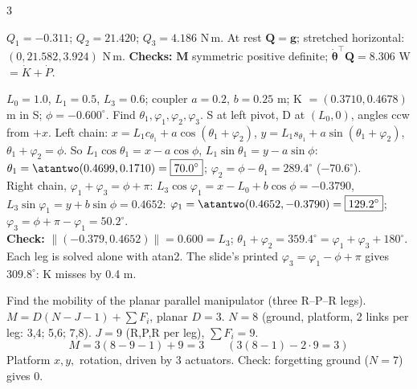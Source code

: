 \begin{multicols}{3}
\begin{examq}[Q4 (e): numbers]
$Q_1=\boxed{-0.311}$; $Q_2=\boxed{21.420}$; $Q_3=\boxed{4.186}$ N\,m. At rest $\mathbf Q=\mathbf g$; stretched horizontal: $(0,21.582,3.924)$ N\,m. \textbf{Checks:} $\mathbf M$ symmetric positive definite; $\dot{\boldsymbol\theta}^\top\mathbf Q=8.306$ W $=\dot K+\dot P$. \chk
\end{examq}
\begin{examq}
$L_0=1.0$, $L_1=0.5$, $L_3=0.6$; coupler $a=0.2$, $b=0.25$ m; K $=(0.3710,0.4678)$ m in {S}; $\phi=-0.600^\circ$. Find $\theta_1,\varphi_1,\varphi_2,\varphi_3$.
\solution
{S} at left pivot, {D} at $(L_0,0)$, angles ccw from $+x$. Left chain: $x=L_1c_{\theta_1}+a\cos(\theta_1{+}\varphi_2)$, $y=L_1s_{\theta_1}+a\sin(\theta_1{+}\varphi_2)$, $\theta_1+\varphi_2=\phi$. So $L_1\cos\theta_1=x-a\cos\phi$, $L_1\sin\theta_1=y-a\sin\phi$: $\theta_1=\atantwo(0.4699,0.1710)=\boxed{70.0^\circ}$; $\varphi_2=\phi-\theta_1=\boxed{289.4^\circ}$ ($-70.6^\circ$).\\
Right chain, $\varphi_1+\varphi_3=\phi+\pi$: $L_3\cos\varphi_1=x-L_0+b\cos\phi=-0.3790$, $L_3\sin\varphi_1=y+b\sin\phi=0.4652$: $\varphi_1=\atantwo(0.4652,-0.3790)=\boxed{129.2^\circ}$; $\varphi_3=\phi+\pi-\varphi_1=\boxed{50.2^\circ}$.\\
\textbf{Check:} $\lVert(-0.379,0.4652)\rVert=0.600=L_3$; $\theta_1+\varphi_2=359.4^\circ=\varphi_1+\varphi_3+180^\circ$. Each leg is solved alone with atan2. The slide's printed $\varphi_3=\varphi_1-\phi+\pi$ gives $309.8^\circ$: K misses by 0.4 m.
\end{examq}
\begin{examq}
Find the mobility of the planar parallel manipulator (three R--P--R legs).
\solution
$M=D(N-J-1)+\sum F_i$, planar $D=3$. $N=8$ (ground, platform, 2 links per leg: 3,4; 5,6; 7,8). $J=9$ (R,P,R per leg), $\sum F_i=9$.
\[M=3(8-9-1)+9=\boxed{3}\qquad(3(8-1)-2\cdot9=3)\]
Platform $x,y,$ rotation, driven by 3 actuators. Check: forgetting ground ($N=7$) gives $0$. \chk
\end{examq}
\begin{examq}

\end{examq}
\end{multicols}
